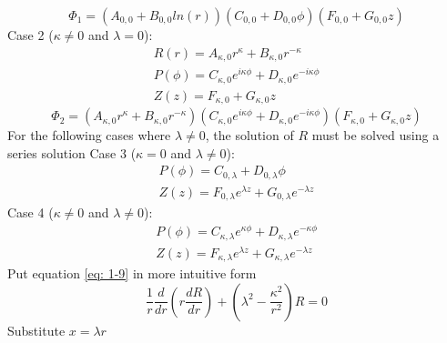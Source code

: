 \documentclass[12pt]{article}
\begin{document}
    \begin{equation} \label{eq: 1-15}
        \Phi_1 = (A_{0,0} + B_{0,0} ln(r)) (C_{0,0} + D_{0,0}\phi) (F_{0,0} + G_{0,0}z)
    \end{equation}
    Case 2 ($\kappa \neq 0$ and $\lambda = 0$): 
    \begin{equation} \label{eq: 1-16}
        \begin{split}
            R(r) = A_{\kappa,0} r^\kappa + B_{\kappa,0} r^{-\kappa}
            \\ P(\phi) = C_{\kappa,0} e^{i \kappa \phi} + D_{\kappa,0} e^{-i \kappa \phi}
            \\ Z(z) = F_{\kappa,0} + G_{\kappa,0} z
        \end{split}
    \end{equation}
    \begin{equation} \label{eq: 1-17}
        \Phi_2 = (A_{\kappa,0} r^\kappa + B_{\kappa,0} r^{-\kappa}) (C_{\kappa,0} e^{i \kappa \phi} + D_{\kappa,0} e^{-i \kappa \phi}) (F_{\kappa,0} + G_{\kappa,0} z)
    \end{equation}
    For the following cases where $\lambda \neq 0$, the solution of $R$ must be solved using a series solution
    Case 3 ($\kappa = 0$ and $\lambda \neq 0$): 
    \begin{equation} \label{eq: 1-18}
        \begin{split}
            P(\phi) = C_{0,\lambda} + D_{0,\lambda} \phi
            \\ Z(z) = F_{0,\lambda} e^{\lambda z} + G_{0,\lambda} e^{-\lambda z}
        \end{split}        
    \end{equation}
    Case 4 ($\kappa \neq 0$ and $\lambda \neq 0$): 
    \begin{equation} \label{eq: 1-19}
        \begin{split}
            P(\phi) = C_{\kappa,\lambda} e^{\kappa \phi} + D_{\kappa,\lambda} e^{- \kappa \phi}
            \\ Z(z) = F_{\kappa,\lambda} e^{\lambda z} + G_{\kappa,\lambda} e^{-\lambda z}
        \end{split}        
    \end{equation}
    Put equation \ref{eq: 1-9} in more intuitive form
    \begin{equation} \label{eq: 1-20}
        \frac{1}{r} \frac{d}{dr} (r \frac{dR}{dr}) + \left(\lambda^2 - \frac{\kappa^2}{r^2} \right) R = 0
    \end{equation}
    Substitute $x=\lambda r$
\end{document}

